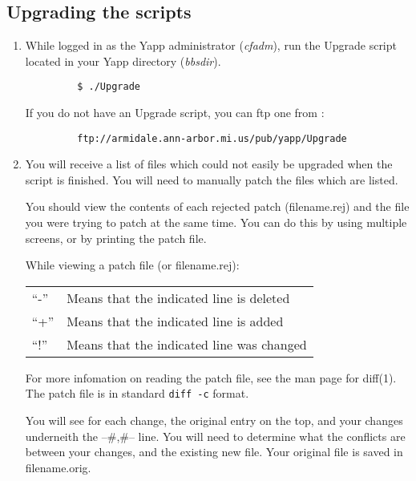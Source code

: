 \documentclass[twoside]{report}
\begin{document}
   \subsection{Upgrading the scripts}
      \begin{enumerate}
   
      \item While logged in as the Yapp administrator ({\em cfadm}), 
         run the Upgrade script located in your Yapp directory ({\em bbsdir}).
         

         \begin{verbatim}
         $ ./Upgrade
         \end{verbatim}

         If you do not have an Upgrade script, you can ftp one from :
         \begin{verbatim}
         ftp://armidale.ann-arbor.mi.us/pub/yapp/Upgrade
         \end{verbatim}
         \vspace{-12pt}

      \item You will receive a list of files which could not easily be 
         upgraded when the script is finished.  You will need to manually patch
         the files which are listed.
   
         You should view the contents of each rejected patch (filename.rej) 
         and the file you were trying to patch at the same time.  
         You can do this by using multiple screens, or by printing the patch 
         file.
   
         While viewing a patch file (or filename.rej):

         \begin{tabular}{ll}
         ``-'' & Means that the indicated line is deleted\\
         ``+'' & Means that the indicated line is added\\
         ``!'' & Means that the indicated line was changed\\
         \end{tabular}
   
         For more infomation on reading the patch file, see the man page for
         diff(1).   The patch file is in standard {\tt diff -c} format.
   
         You will see for each change, the original entry on the top, 
         and your changes underneith the --\#,\#-- line.  You will need to 
         determine what the conflicts are between your changes, 
         and the existing new file.  Your original file is saved in 
         filename.orig.
   

\end{enumerate}
\end{document}
